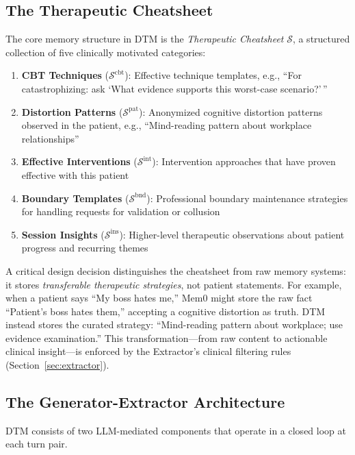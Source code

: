 \subsection{The Therapeutic Cheatsheet}

The core memory structure in DTM is the \emph{Therapeutic Cheatsheet} $\mathcal{S}$, a structured collection of five clinically motivated categories:

\begin{enumerate}
    \item \textbf{CBT Techniques} ($\mathcal{S}^{\text{cbt}}$): Effective technique templates, e.g., ``For catastrophizing: ask `What evidence supports this worst-case scenario?'\,''
    \item \textbf{Distortion Patterns} ($\mathcal{S}^{\text{pat}}$): Anonymized cognitive distortion patterns observed in the patient, e.g., ``Mind-reading pattern about workplace relationships''
    \item \textbf{Effective Interventions} ($\mathcal{S}^{\text{int}}$): Intervention approaches that have proven effective with this patient
    \item \textbf{Boundary Templates} ($\mathcal{S}^{\text{bnd}}$): Professional boundary maintenance strategies for handling requests for validation or collusion
    \item \textbf{Session Insights} ($\mathcal{S}^{\text{ins}}$): Higher-level therapeutic observations about patient progress and recurring themes
\end{enumerate}

A critical design decision distinguishes the cheatsheet from raw memory systems: it stores \emph{transferable therapeutic strategies}, not patient statements. For example, when a patient says ``My boss hates me,'' Mem0 might store the raw fact ``Patient's boss hates them,'' accepting a cognitive distortion as truth. DTM instead stores the curated strategy: ``Mind-reading pattern about workplace; use evidence examination.'' This transformation---from raw content to actionable clinical insight---is enforced by the Extractor's clinical filtering rules (Section~\ref{sec:extractor}).

\subsection{The Generator-Extractor Architecture}

DTM consists of two LLM-mediated components that operate in a closed loop at each turn pair.

